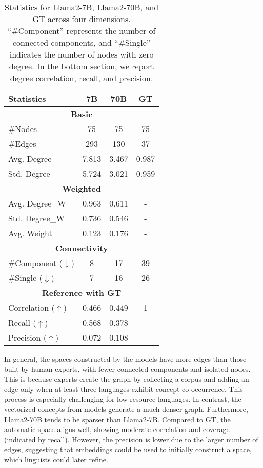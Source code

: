 \begin{table}[h]
\centering
\begin{tabular}{lccc}
\toprule
\textbf{Statistics} & \textbf{7B} & \textbf{70B} & \textbf{GT} \\
\midrule
\multicolumn{4}{c}{\textbf{Basic}} \\  
\cmidrule(lr){1-4}
\#Nodes & 75 & 75 & 75 \\
\#Edges & 293 & 130 & 37 \\
Avg. Degree & 7.813 & 3.467 & 0.987 \\
Std. Degree & 5.724 & 3.021 & 0.959 \\
\midrule
\multicolumn{4}{c}{\textbf{Weighted}} \\  
\cmidrule(lr){1-4}
Avg. Degree\_W & 0.963 & 0.611  & - \\
Std. Degree\_W & 0.736 & 0.546 & - \\
Avg. Weight & 0.123 & 0.176 & - \\
\midrule
\multicolumn{4}{c}{\textbf{Connectivity}} \\  
\cmidrule(lr){1-4}
\#Component ($\downarrow$) & 8 & 17 & 39 \\
\#Single ($\downarrow$) &7  & 16 & 26 \\
\midrule
\multicolumn{4}{c}{\textbf{Reference with GT}} \\
\cmidrule(lr){1-4}
Correlation ($\uparrow$) & 0.466 & 0.449 & 1 \\
Recall ($\uparrow$) & 0.568 & 0.378 & - \\
Precision ($\uparrow$) & 0.072 & 0.108 & - \\
\bottomrule
\end{tabular}
\caption{Statistics for Llama2-7B, Llama2-70B, and GT across four dimensions. ``\#Component'' represents the number of connected components, and ``\#Single'' indicates the number of nodes with zero degree. In the bottom section, we report degree correlation, recall, and precision.}
\label{tab:SMM_stats}
\end{table}



In general, the spaces constructed by the models have more edges than those built by human experts, with fewer connected components and isolated nodes. This is because experts create the graph by collecting a corpus and adding an edge only when at least three languages exhibit concept co-occurrence. This process is especially challenging for low-resource languages. In contrast, the vectorized concepts from models generate a much denser graph. Furthermore, Llama2-70B tends to be sparser than Llama2-7B. Compared to GT, the automatic space aligns well, showing moderate correlation and coverage (indicated by recall). However, the precision is lower due to the larger number of edges, suggesting that embeddings could be used to initially construct a space, which linguists could later refine.
